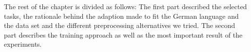 The rest of the chapter is divided as follows: The first part described the
selected tasks, the rationale behind the adaption made to fit the German
language and the data set  and the different preprocessing alternatives we
tried. The second part describes the training approach as well as the most
important result of the experiments.
















